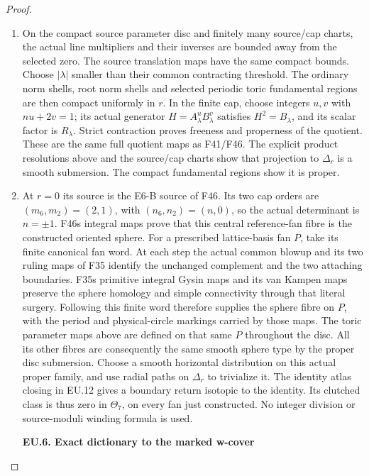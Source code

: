 \begin{proof}
\begin{enumerate}[label=\arabic*.]
\item On the compact source parameter disc and finitely many source/cap
charts, the actual line multipliers and their inverses are bounded
away from the selected zero. The source translation maps have the
same compact bounds. Choose \(|\lambda|\) smaller than their common
contracting threshold. The ordinary norm shells, root norm shells
and selected periodic toric fundamental regions are then compact
uniformly in \(r\). In the finite cap, choose integers \(u,v\) with
\(nu+2v=1\); its actual generator
\(H=A_\lambda^uB_\lambda^v\) satisfies \(H^2=B_\lambda\), and its
scalar factor is \(R_\lambda\). Strict contraction proves freeness
and properness of the quotient. These are the same full quotient
maps as F41/F46. The explicit product resolutions above and the
source/cap charts show that projection to \(\Delta_r\) is a smooth
submersion. The compact fundamental regions show it is proper.

\item At \(r=0\) its source is the E6-B source of F46. Its two cap orders
are \((m_6,m_2)=(2,1)\), with \((n_6,n_2)=(n,0)\), so the actual
determinant is \(n=\pm1\). F46\textquotesingle s integral maps prove that this
central reference-fan fibre is the constructed oriented sphere.
For a prescribed lattice-basis fan \(P\), take its finite canonical
fan word. At each step the actual common blowup and its two ruling
maps of F35 identify the unchanged complement and the two attaching
boundaries. F35\textquotesingle s primitive integral Gysin maps and its van Kampen
maps preserve the sphere homology and simple connectivity through
that literal surgery. Following this finite word therefore supplies
the sphere fibre on \(P\), with the period and physical-circle
markings carried by those maps. The toric parameter maps above are
defined on that same \(P\) throughout the disc. All its other
fibres are consequently the same smooth sphere type by the proper
disc submersion. Choose a smooth horizontal distribution on this actual
proper family, and use radial paths on \(\Delta_r\) to trivialize
it. The identity atlas closing in EU.12 gives a boundary return
isotopic to the identity. Its clutched class is thus zero in
\(\Theta_7\), on every fan just constructed. No integer division
or source-moduli winding formula is used.

\par

\medskip\noindent\textbf{EU.6. Exact dictionary to the marked w-cover}

\par\nobreak


\end{enumerate}
\end{proof}
